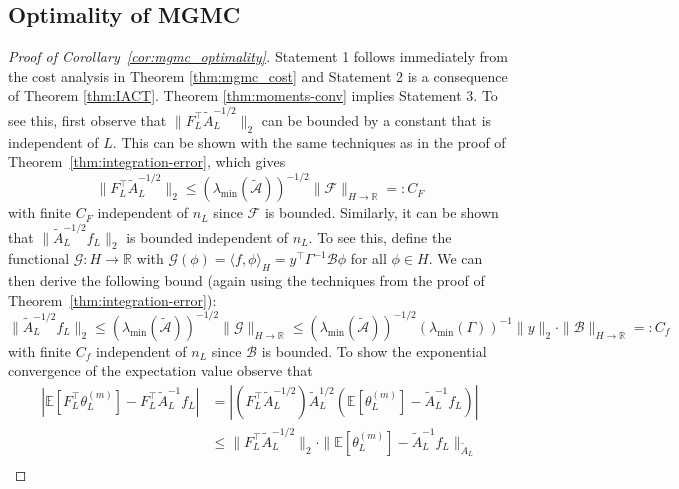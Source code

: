 \documentclass[11pt,english]{article}
\theoremstyle{plain}
\theoremstyle{plain}
\theoremstyle{plain}
\theoremstyle{plain}
\numberwithin{equation}{section}
\begin{document}
\subsection{Optimality of MGMC}\label{sec:proof_optimality}
\begin{proof}[Proof of Corollary~\ref{cor:mgmc_optimality}]
	Statement 1 follows immediately from the cost analysis in Theorem \ref{thm:mgmc_cost} and Statement 2 is a consequence of Theorem \ref{thm:IACT}. Theorem \ref{thm:moments-conv} implies Statement 3. To see this, first observe that $\|F_L^\top \widetilde{A}_L^{-1/2}\|_2$ can be bounded by a constant that is independent of $L$. This can be shown with the same techniques as in the proof of Theorem~\ref{thm:integration-error}, which gives
\begin{equation}
	\|F_L^\top\widetilde{A}_L^{-1/2}\|_2 \le (\lambda_{\min}(\widetilde{\mathcal{A}}))^{-1/2}\|\mathcal{F}\|_{H\rightarrow \mathbb{R}}=:C_F
	\label{eqn:target_variance_bound}
\end{equation}
with finite $C_F$ independent of $n_L$ since $\mathcal{F}$ is bounded. Similarly, it can be shown that $\|\widetilde{A}_L^{-1/2}f_L\|_2$ is bounded independent of $n_L$. To see this, define the functional $\mathcal{G}:H\rightarrow \mathbb{R}$ with $\mathcal{G}(\phi) = \langle f,\phi\rangle_H = y^\top \Gamma^{-1}\mathcal{B}\phi$ for all $\phi\in H$. We can then derive the following bound (again using the techniques from the proof of Theorem~\ref{thm:integration-error}):
\begin{equation}
	\|\widetilde{A}_L^{-1/2}f_L\|_2 \le (\lambda_{\min}(\widetilde{\mathcal{A}}))^{-1/2}\|\mathcal{G}\|_{H\rightarrow \mathbb{R}} \le 
	(\lambda_{\min}(\widetilde{\mathcal{A}}))^{-1/2}\left(\lambda_{\min}(\Gamma)\right)^{-1}\|y\|_2\cdot \|\mathcal{B}\|_{H\rightarrow\mathbb{R}}=:C_f
	\label{eqn:target_mean_bound}
\end{equation}
with finite $C_f$ independent of $n_L$ since $\mathcal{B}$ is bounded. To show the exponential convergence of the expectation value observe that
\begin{equation}
	\begin{aligned}
		\left|\mathbb{E}[F_L^\top\theta_L^{(m)}]-F_L^\top\widetilde{A}_L^{-1}f_L\right| &= \left|(F_L^\top\widetilde{A}_L^{-1/2}) \widetilde{A}_L^{1/2}\left(\mathbb{E}[\theta_L^{(m)}]-\widetilde{A}_L^{-1}f_L\right)\right|\\
		&\leq \| F_L^\top\widetilde{A}_L^{-1/2}\|_2\cdot\|\mathbb{E}[\theta_L^{(m)}]-\widetilde{A}_L^{-1}f_L\|_{\widetilde{A}_L}\\

\end{aligned}
\end{equation}
\end{proof}
\end{document}
